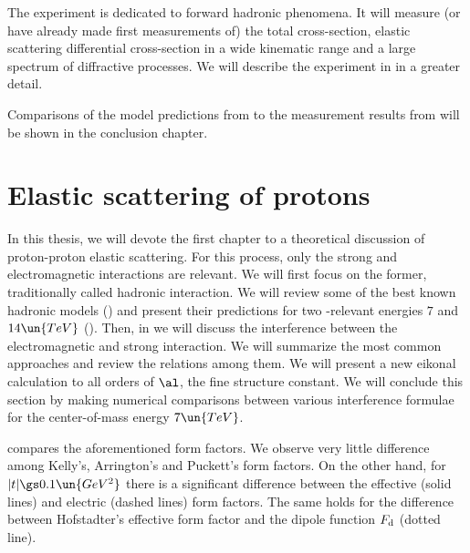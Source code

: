 The  experiment is dedicated to forward hadronic phenomena. It will measure (or have already made first measurements of) the total cross-section, elastic scattering differential cross-section in a wide kinematic range and a large spectrum of diffractive processes. We will describe the experiment in  in a greater detail.



Comparisons of the model predictions from  to the measurement results from  will be shown in the conclusion chapter.


\chapter[el]{Elastic scattering of protons}

In this thesis, we will devote the first chapter to a theoretical discussion of proton-proton elastic scattering. For this process, only the strong and electromagnetic interactions are relevant. We will first focus on the former, traditionally called hadronic interaction. We will review some of the best known hadronic models () and present their predictions for two -relevant energies $7$ and $14\un{TeV}$ (). Then, in  we will discuss the interference between the electromagnetic and strong interaction. We will summarize the most common approaches and review the relations among them. We will present a new eikonal calculation to all orders of $\al$, the fine structure constant. We will conclude this section by making numerical comparisons between various interference formulae for the center-of-mass energy $7\un{TeV}$.



 compares the aforementioned form factors. We observe very little difference among Kelly's, Arrington's and Puckett's form factors. On the other hand, for $|t| \gs 0.1\un{GeV^2}$ there is a significant difference between the effective (solid lines) and electric (dashed lines) form factors. The same holds for the difference between Hofstadter's effective form factor and the dipole function $F_{\rm d}$ (dotted line).

